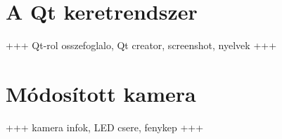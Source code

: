 \section{A Qt keretrendszer}\label{sect:qt}

+++ Qt-rol osszefoglalo, Qt creator, screenshot, nyelvek +++

\section{Módosított kamera}\label{sect:infracam}

+++ kamera infok, LED csere, fenykep +++